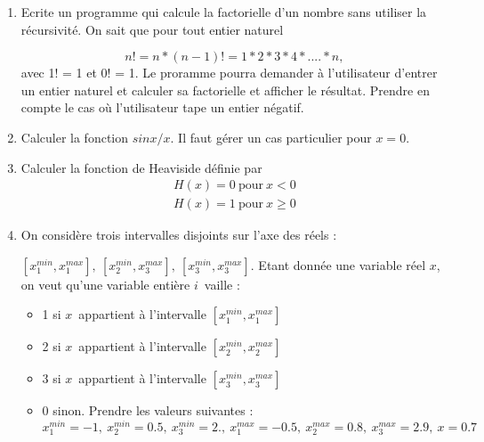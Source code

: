 \documentclass[a4paper, oneside,11pt]{book}
\begin{document}
\begin{enumerate}
Rappelons que l'insertion dans le flot cout d'une expression de la forme setw(n) , où n est une
expression enti\`ere, demande de r\'ealiser l'affichage suivant sur n caract\`eres au minimum. L'emploi de
setw n\'ecessite l'inclusion du fichier iomanip .

\item Ecrite un programme qui calcule la factorielle d'un nombre sans utiliser la r\'ecursivit\'e. On sait que pour tout entier naturel

\begin{equation*}
n! = n*(n-1)! = 1*2*3*4*....*n,
\end{equation*}
avec 1! = 1 et 0! = 1.
Le proramme pourra demander \`a l'utilisateur d'entrer un entier naturel et calculer sa factorielle et afficher le r\'esultat. Prendre en compte le cas o\`u l'utilisateur 
tape un entier n\'egatif.

\item Calculer la fonction $sin x/x$. Il faut g\'erer un cas particulier pour $x = 0$. 

\item Calculer la fonction de Heaviside d\'efinie par
\begin{eqnarray*}
H\left(x\right) = 0\ \mbox{pour}\ x< 0\\
H\left(x\right) = 1\ \mbox{pour}\ x\geq 0
\end{eqnarray*}

\item On consid\`ere trois intervalles disjoints sur l'axe des r\'eels : 

$\left[x_{1}^{min}, x_{1}^{max}\right],\ \left[x_{2}^{min}, x_{3}^{max}\right],\
\left[x_{3}^{min}, x_{3}^{max}\right]$. Etant donn\'ee une variable r\'eel $x$, on veut qu'une variable enti\`ere $i$\ vaille : 

\begin{itemize}
\item[] 1 si $x$\ appartient \`a l'intervalle $\left[x_{1}^{min}, x_{1}^{max}\right]$
\item[] 2 si $x$\ appartient \`a l'intervalle $\left[x_{2}^{min}, x_{2}^{max}\right]$
\item[] 3 si $x$\ appartient \`a l'intervalle $\left[x_{3}^{min}, x_{3}^{max}\right]$
\item[] 0 sinon.
Prendre les valeurs suivantes : $x_{1}^{min} = -1,\ x_{2}^{min} = 0.5,\ x_{3}^{min} = 2.,\ x_{1}^{max} = -0.5,\ x_{2}^{max} = 0.8,\ x_{3}^{max} = 2.9,\ x = 0.7$
\end{itemize}


\end{enumerate}
\end{document}
